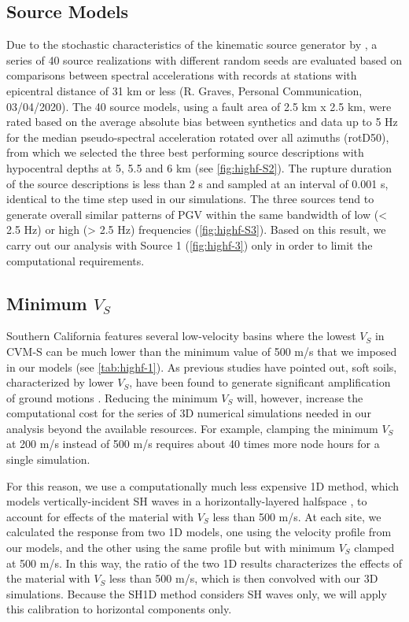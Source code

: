 \subsection{Source Models}
Due to the stochastic characteristics of the kinematic source generator by \citet{gravesKinematicGroundMotion2016}, a series of 40 source realizations with different random seeds are evaluated based on comparisons between spectral accelerations with records at stations with epicentral distance of 31 km or less (R. Graves, Personal Communication, 03/04/2020). The 40 source models, using a fault area of 2.5 km x 2.5 km, were rated based on the average absolute bias between synthetics and data up to 5 Hz for the median pseudo-spectral acceleration rotated over all azimuths (rotD50), from which we selected the three best performing source descriptions with hypocentral depths at 5, 5.5 and 6 km (see \cref{fig:highf-S2}). The rupture duration of the source descriptions is less than 2 s and sampled at an interval of 0.001 s, identical to the time step used in our simulations. The three sources tend to generate overall similar patterns of PGV within the same bandwidth of low (< 2.5 Hz) or high (> 2.5 Hz) frequencies (\cref{fig:highf-S3}). Based on this result, we carry out our analysis with Source 1 (\cref{fig:highf-3}) only in order to limit the computational requirements.

\subsection{Minimum \textbf{$V_S$}}
Southern California features several low-velocity basins where the lowest $V_S$ in CVM-S can be much lower than the minimum value of 500 m/s that we imposed in our models (see \cref{tab:highf-1}). As previous studies have pointed out, soft soils, characterized by lower $V_S$, have been found to generate significant amplification of ground motions . Reducing the minimum $V_S$ will, however, increase the computational cost for the series of 3D numerical simulations needed in our analysis beyond the available resources. For example, clamping the minimum $V_S$ at 200 m/s instead of 500 m/s requires about 40 times more node hours for a single simulation. 

For this reason, we use a computationally much less expensive 1D method, which models vertically-incident SH waves in a horizontally-layered halfspace , to account for effects of the material with $V_S$ less than 500 m/s. At each site, we calculated the response from two 1D models, one using the velocity profile from our models, and the other using the same profile but with minimum $V_S$ clamped at 500 m/s. In this way, the ratio of the two 1D results characterizes the effects of the material with $V_S$ less than 500 m/s, which is then convolved with our 3D simulations. Because the SH1D method considers SH waves only, we will apply this calibration to horizontal components only. 

